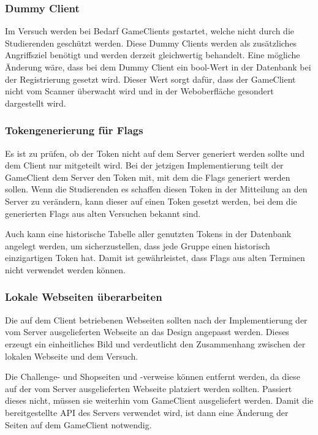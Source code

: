 \subsubsection{Dummy Client}
Im Versuch werden bei Bedarf GameClients gestartet, welche nicht durch die Studierenden geschützt werden. Diese Dummy Clients werden als zusätzliches Angriffsziel benötigt und werden derzeit gleichwertig behandelt. Eine mögliche Änderung wäre, dass bei dem Dummy Client ein bool-Wert in der Datenbank bei der Registrierung gesetzt wird. Dieser Wert sorgt dafür, dass der GameClient nicht vom Scanner überwacht wird und in der Weboberfläche gesondert dargestellt wird.

\subsubsection{Tokengenerierung für Flags}
Es ist zu prüfen, ob der Token nicht auf dem Server generiert werden sollte und dem Client nur mitgeteilt wird. Bei der jetzigen Implementierung teilt der GameClient dem Server den Token mit, mit dem die Flags generiert werden sollen. Wenn die   Studierenden es schaffen diesen Token in der Mitteilung an den Server zu verändern, kann dieser auf einen Token gesetzt werden, bei dem die generierten Flags aus alten Versuchen bekannt sind.

Auch kann eine historische Tabelle aller genutzten Tokens in der Datenbank angelegt werden, um sicherzustellen, dass jede Gruppe einen historisch einzigartigen Token hat. Damit ist gewährleistet, dass Flags aus alten Terminen nicht verwendet werden können.

\subsubsection{Lokale Webseiten überarbeiten}
Die auf dem Client betriebenen Webseiten sollten nach der Implementierung der vom Server ausgelieferten Webseite an das Design angepasst werden. Dieses erzeugt ein einheitliches Bild und verdeutlicht den Zusammenhang zwischen der lokalen Webseite und dem Versuch.

Die Challenge- und Shopseiten und -verweise können entfernt werden, da diese auf der vom Server ausgelieferten Webseite platziert werden sollten. Passiert dieses nicht, müssen sie weiterhin vom GameClient ausgeliefert werden. Damit die bereitgestellte API des Servers verwendet wird, ist dann eine Änderung der Seiten auf dem GameClient notwendig.